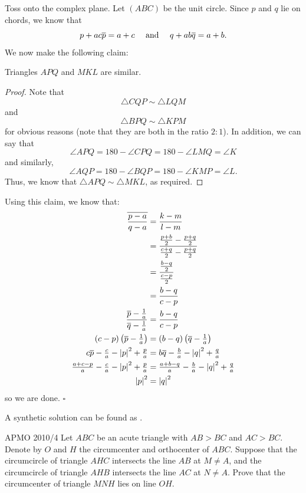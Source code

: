 \documentclass{article}
\begin{document}
Toss onto the complex plane. Let $(ABC)$ be the unit circle. Since $p$ and $q$ lie on chords, we know that \[p+ac\overline{p}=a+c \quad \text{ and } \quad q+ab\overline{q}=a+b.\] We now make the following claim:
\begin{claim*}
Triangles $APQ$ and $MKL$ are similar.
\end{claim*} 
\begin{proof}
Note that \[\triangle CQP \sim \triangle LQM\] and \[\triangle BPQ \sim \triangle KPM\] for obvious reasons (note that they are both in the ratio $2:1$). In addition, we can say that \[\angle APQ = 180-\angle CPQ = 180-\angle LMQ = \angle K\] and similarly, \[\angle AQP = 180-\angle BQP = 180-\angle KMP = \angle L.\] Thus, we know that $\triangle APQ \sim \triangle MKL$, as required.
\end{proof}
Using this claim, we know that:
\begin{align*}
\overline{\dfrac{p-a}{q-a}} &= \dfrac{k-m}{l-m} \\
&= \dfrac{\tfrac{p+b}{2}-\tfrac{p+q}{2}}{\tfrac{c+q}{2}-\tfrac{p+q}{2}} \\
&= \dfrac{\tfrac{b-q}{2}}{\tfrac{c-p}{2}} \\
&= \dfrac{b-q}{c-p} \\
\dfrac{\overline{p}-\tfrac{1}{a}}{\overline{q}-\tfrac{1}{a}} &= \dfrac{b-q}{c-p} \\
(c-p)\left(\overline{p}-\tfrac{1}{a}\right) &= (b-q)\left(\overline{q}-\tfrac{1}{a}\right) \\
c\overline{p}-\tfrac{c}{a}-\left\lvert p \right\rvert^2+\tfrac{p}{a} &= b\overline{q}-\tfrac{b}{a}-\left\lvert q \right\rvert^2+\tfrac{q}{a} \\
\tfrac{a+c-p}{a}-\tfrac{c}{a}-\left\lvert p \right\rvert^2+\tfrac{p}{a} &= \tfrac{a+b-q}{a}-\tfrac{b}{a}-\left\lvert q \right\rvert^2+\tfrac{q}{a} \\
\left\lvert p \right\rvert^2  &= \left\lvert q \right\rvert^2
\end{align*}
so we are done. $\square$
\begin{remark*}
A synthetic solution can be found as .
\end{remark*}

\newpage

\begin{problem}[6.42]{APMO 2010/4}
Let $ABC$ be an acute triangle with $AB > BC$ and $AC > BC$. Denote by $O$ and $H$ the circumcenter and orthocenter of $ABC$. Suppose that the circumcircle of triangle $AHC$ intersects the line $AB$ at $M \neq A$, and the circumcircle of triangle $AHB$ intersects the line $AC$ at $N \neq A$. Prove that the circumcenter of triangle $MNH$ lies on line $OH$.
\end{problem}
\end{document}
